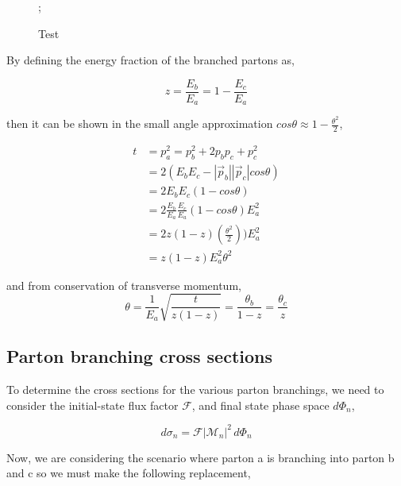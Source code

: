\documentclass[main.tex]{subfiles}
\begin{document}
\begin{figure}[H]
    \centering
    ;
    \caption{Test}
    \label{fig: test2}
\end{figure}

By defining the energy fraction of the branched partons as, 

\begin{equation}\label{eqn: branched_energy_fractions_ellis_5.2}
    z = \frac{E_b}{E_a} = 1- \frac{E_c}{E_a}
\end{equation}

then it can be shown in the small angle approximation \(cos \theta \approx 1- \frac{\theta^2}{2}\),

\begin{align*}
    t&= p_a^2 = p_b^2 + 2 p_b p_c + p_c^2 \\
    &= 2 (E_b E_c - |\vec p_b||\vec p_c| cos \theta )\\
    &= 2 E_b E_c (1-cos \theta) \\ 
    &= 2 \frac{E_b}{E_a} \frac{E_c}{E_a} (1-cos \theta) E_a^2 \\
    &= 2 z (1-z)  (\frac{\theta^2}{2})) E_a^2 \\
    &= z (1-z) E_a^2 \theta^2
\end{align*}

and from conservation of transverse momentum, 
\begin{equation}\label{eqn: theta_momentum_conv_ellis_5.4}
    \theta = \frac{1}{E_a} \sqrt{\frac{t}{z(1-z)}} = \frac{\theta_b}{1-z} = \frac{\theta_c}{z}
\end{equation}

\subsection{Parton branching cross sections}
To determine the cross sections for the various parton branchings, we need to consider the initial-state flux factor \(\mathcal{F}\), and final state phase space \(d\Phi_n\),

\begin{equation*}
    d\sigma_n = \mathcal{F} |\mathcal{M}_n|^2 \, d\Phi_n
\end{equation*}

Now, we are considering the scenario where parton a is branching into parton b and c so we must make the following replacement, 
\end{document}
